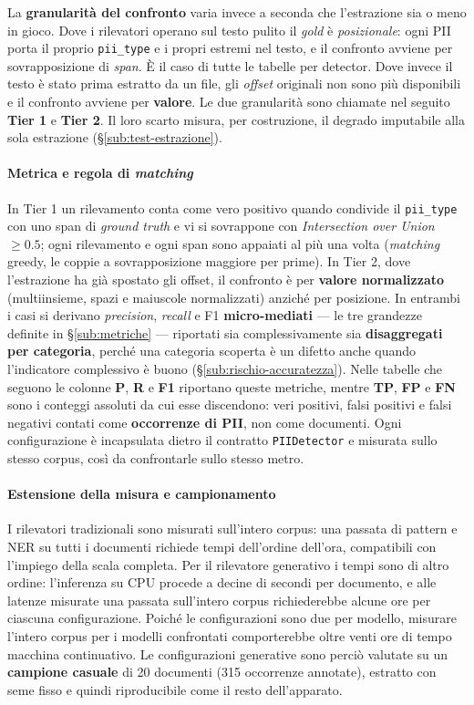 La \textbf{granularità del confronto} varia invece a seconda che l'estrazione sia o meno in gioco. Dove i rilevatori operano sul testo pulito il \textit{gold} è \emph{posizionale}: ogni PII porta il proprio \texttt{pii\_type} e i propri estremi nel testo, e il confronto avviene per sovrapposizione di \textit{span}. È il caso di tutte le tabelle per detector. Dove invece il testo è stato prima estratto da un file, gli \textit{offset} originali non sono più disponibili e il confronto avviene per \textbf{valore}. Le due granularità sono chiamate nel seguito \textbf{Tier 1} e \textbf{Tier 2}. Il loro scarto misura, per costruzione, il degrado imputabile alla sola estrazione (§\ref{sub:test-estrazione}).

\paragraph*{Metrica e regola di \textit{matching}} In Tier 1 un rilevamento conta come vero positivo quando condivide il \texttt{pii\_type} con uno span di \textit{ground truth} e vi si sovrappone con \textit{Intersection over Union} $\geq 0.5$; ogni rilevamento e ogni span sono appaiati al più una volta (\textit{matching} greedy, le coppie a sovrapposizione maggiore per prime). In Tier 2, dove l'estrazione ha già spostato gli offset, il confronto è per \textbf{valore normalizzato} (multiinsieme, spazi e maiuscole normalizzati) anziché per posizione. In entrambi i casi si derivano \textit{precision}, \textit{recall} e F1 \textbf{micro-mediati} --- le tre grandezze definite in §\ref{sub:metriche} --- riportati sia complessivamente sia \textbf{disaggregati per categoria}, perché una categoria scoperta è un difetto anche quando l'indicatore complessivo è buono (§\ref{sub:rischio-accuratezza}). Nelle tabelle che seguono le colonne \textbf{P}, \textbf{R} e \textbf{F1} riportano queste metriche, mentre \textbf{TP}, \textbf{FP} e \textbf{FN} sono i conteggi assoluti da cui esse discendono: veri positivi, falsi positivi e falsi negativi contati come \textbf{occorrenze di PII}, non come documenti. Ogni configurazione è incapsulata dietro il contratto \texttt{PIIDetector} e misurata sullo stesso corpus, così da confrontarle sullo stesso metro.

\paragraph*{Estensione della misura e campionamento} I rilevatori tradizionali sono misurati sull'intero corpus: una passata di pattern e NER su tutti i documenti richiede tempi dell'ordine dell'ora, compatibili con l'impiego della scala completa. Per il rilevatore generativo i tempi sono di altro ordine: l'inferenza su CPU procede a decine di secondi per documento, e alle latenze misurate una passata sull'intero corpus richiederebbe alcune ore per ciascuna configurazione. Poiché le configurazioni sono due per modello, misurare l'intero corpus per i modelli confrontati comporterebbe oltre venti ore di tempo macchina continuativo. Le configurazioni generative sono perciò valutate su un \textbf{campione casuale} di 20 documenti (315 occorrenze annotate), estratto con seme fisso e quindi riproducibile come il resto dell'apparato.

